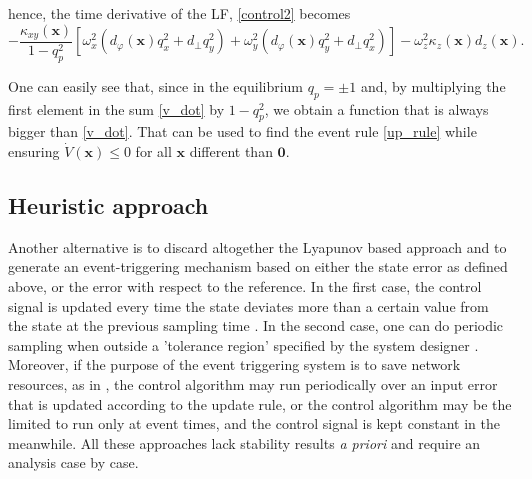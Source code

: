 \documentclass{article}
\begin{document}
		hence, the time derivative of the LF, \eqref{control2} becomes
		\begin{equation}
			-\frac{\kappa_{xy}(\mathbf{x})}{1-q_p^2} \left [ \omega_x^2 \left (d_\varphi(\mathbf{x}) q_x^2 + d_\perp q_y^2 \right ) + \omega_y^2 \left (d_\varphi(\mathbf{x}) q_y^2 + d_\perp q_x^2 \right ) \right ] - \omega_z^2 \kappa_z(\mathbf{x}) d_z(\mathbf{x}).
			\label{v_dot}
		\end{equation}
		
		One can easily see that, since in the equilibrium $q_p = \pm 1$ and, by multiplying the first element in the sum \eqref{v_dot} by $1-q_p^2$, we obtain a function that is always bigger than \eqref{v_dot}. That can be used to find the event rule \eqref{up_rule} while ensuring $\dot V(\mathbf{x}) \leq 0$ for all $\mathbf{x}$ different than $\mathbf{0}$.
		
		\subsection{Heuristic approach}
			Another alternative is to discard altogether the Lyapunov based approach and to generate an event-triggering mechanism based on either the state error as defined above, or the error with respect to the reference. In the first case, the control signal is updated every time the state deviates more than a certain value from the state at the previous sampling time \cite{lehmann}. In the second case, one can do periodic sampling when outside a 'tolerance region' specified by the system designer \cite{astrom}. Moreover, if the purpose of the event triggering system is to save network resources, as in \cite{lehmann}, the control algorithm may run periodically over an input error that is updated according to the update rule, or the control algorithm may be the limited to run only at event times, and the control signal is kept constant in the meanwhile. All these approaches lack stability results \emph{a priori} and require an analysis case by case.
		
\end{document}
